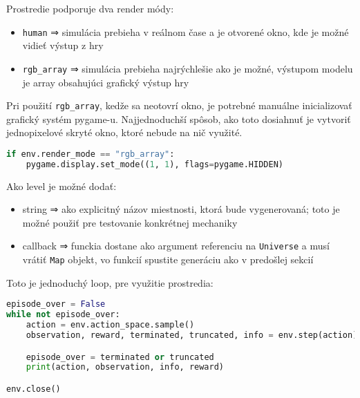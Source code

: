 Prostredie podporuje dva render módy:

\begin{itemize}
    \item \texttt{human} ⇒ simulácia prebieha v reálnom čase a je otvorené okno, kde je možné vidieť výstup z hry
    \item \texttt{rgb\_array} ⇒ simulácia prebieha najrýchlešie ako je možné, výstupom modelu je array obsahujúci grafický výstup hry
\end{itemize}

Pri použití \texttt{rgb\_array}, kedže sa neotovrí okno, je potrebné manuálne inicializovať grafický systém pygame-u. Najjednoduchší spôsob, ako toto dosiahnuť je vytvoriť jednopixelové skryté okno, ktoré nebude na nič využité.

\begin{lstlisting}[language=python]
if env.render_mode == "rgb_array":
    pygame.display.set_mode((1, 1), flags=pygame.HIDDEN)
\end{lstlisting}

Ako level je možné dodať:

\begin{itemize}
    \item string ⇒ ako explicitný názov miestnosti, ktorá bude vygenerovaná; toto je možné použiť pre testovanie konkrétnej mechaniky
    \item callback ⇒ funckia dostane ako argument referenciu na \texttt{Universe} a musí vrátiť \texttt{Map} objekt, vo funkcií spustite generáciu ako v predošlej sekcií
\end{itemize}

Toto je jednoduchý loop, pre využitie prostredia:

\begin{lstlisting}[language=python]
episode_over = False
while not episode_over:
    action = env.action_space.sample()
    observation, reward, terminated, truncated, info = env.step(action)

    episode_over = terminated or truncated
    print(action, observation, info, reward)

env.close()
\end{lstlisting}


